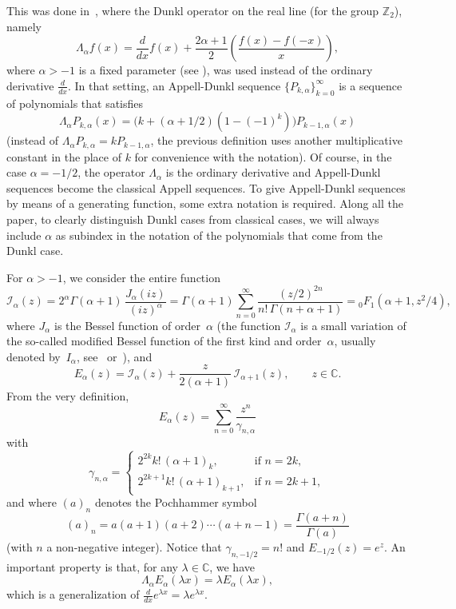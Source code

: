 \documentclass[11pt]{article}
\theoremstyle{plain}
\theoremstyle{remark}
\numberwithin{equation}{section} %
\newcommand{\Ea}{E_{\alpha}}
\newcommand{\La}{\Lambda_{\alpha}}
\newcommand{\I}{\mathcal{I}}
\newcommand{\CC}{\mathbb{C}}
\newcommand{\cc}{\gamma}
\begin{document}
This was done in~\cite{CDPV}, where the Dunkl operator on the real line
(for the group $\mathbb{Z}_2$), 
namely
\begin{equation}
\label{eq:La}
  \La f(x) = \frac{d}{dx}f(x) + \frac{2\alpha+1}{2}
  \left(\frac{f(x)-f(-x)}{x}\right),
\end{equation}
where $\alpha > -1$ is a fixed parameter (see \cite{Du, Ros}),
was used instead of the ordinary derivative $\frac{d}{dx}$. 
In that setting, an Appell-Dunkl sequence $\{P_{k,\alpha}\}_{k=0}^{\infty}$ is
a sequence of polynomials that satisfies
\begin{equation}
\label{eq:LaPk}
  \La P_{k,\alpha}(x) = \big(k+(\alpha+1/2)(1-(-1)^k)\big) P_{k-1,\alpha}(x)
\end{equation}
(instead of $\La P_{k,\alpha} = k P_{k-1,\alpha}$, the previous definition uses 
another multiplicative constant in the place of $k$ for convenience with the notation). 
Of course, in the case $\alpha=-1/2$,
the operator $\La$ is the ordinary derivative and Appell-Dunkl sequences become
the classical Appell sequences. To give Appell-Dunkl sequences by means of 
a generating function, some extra notation is required.
Along all the paper, to clearly distinguish Dunkl cases from classical cases,
we will always include $\alpha$ as subindex in the notation of the polynomials
that come from the Dunkl case.

For $\alpha>-1$, we consider the entire function
\[
  \I_\alpha(z)
  = 2^\alpha \Gamma(\alpha+1)\, \frac{J_\alpha(iz)}{(iz)^\alpha}
  = \Gamma(\alpha+1) \sum_{n=0}^\infty \frac{(z/2)^{2n}}{n!\,\Gamma(n+\alpha+1)}
  = {}_0F_1(\alpha+1,z^2/4), 
\]
where $J_\alpha$ is the Bessel function of order~$\alpha$
(the function $\I_\alpha$ is a small variation of the so-called modified Bessel function of the first kind and order~$\alpha$, usually denoted by~$I_\alpha$, see~\cite{Wat} or~\cite{OlMa-NIST}),
and 
\[
  \Ea(z) = \I_\alpha(z) + \frac{z}{2(\alpha+1)} \, \I_{\alpha+1}(z),
  \qquad z \in \CC.
\]
From the very definition,
\[
  \Ea(z) = \sum_{n=0}^\infty \frac{z^n}{\cc_{n,\alpha}}
\]
with
\begin{equation}
\label{eq:ccna}
\cc_{n,\alpha} =
\begin{cases}
  2^{2k}k!\,(\alpha+1)_k, & \text{if $n=2k$},\\
  2^{2k+1}k!\,(\alpha+1)_{k+1}, & \text{if $n=2k+1$},
\end{cases}
\end{equation}
and where $(a)_n$ denotes the Pochhammer symbol
\[
  (a)_n = a(a+1)(a+2) \cdots (a+n-1) = \frac{\Gamma(a+n)}{\Gamma(a)}
\]
(with $n$ a non-negative integer). Notice that $\cc_{n,-1/2} = n!$ and $E_{-1/2}(z) = e^{z}$.
An important property is that, for any $\lambda \in \CC$, we have
\begin{equation}
\label{eq:LaEalx}
  \La \Ea(\lambda x) = \lambda E_\alpha(\lambda x),
\end{equation}
which is a generalization of $\frac{d}{dx} e^{\lambda x} = \lambda e^{\lambda x}$.
\end{document}
